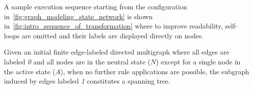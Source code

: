     \begin{figure}[!htbp]
        \centering
        \caption{}
        \label{fig:intro:graph_transformation_rule_0}
    \end{figure}

A sample execution sequence starting from the configuration in~\autoref{fig:graph_modeling_state_network} is shown in~\autoref{fig:intro_sequence_of_transformation} where to improve readability, self-loops are omitted and their labels are displayed directly on nodes. 

Given an initial finite edge-labeled directed multigraph where all edges are labeled \textit{0} and all nodes are in the neutral state ($N$) except for a single node in the active state ($A$), when no further rule applications are possible, the subgraph induced by edges labeled \textit{1} constitutes a spanning tree.

